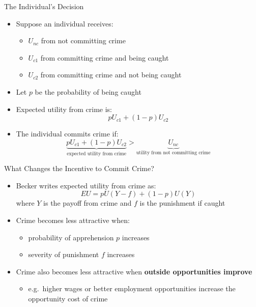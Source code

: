 \documentclass[11pt,notes=hide,aspectratio=169,mathserif]{beamer}
\begin{document}
\begin{frame}{The Individual's Decision}
\begin{itemize}
\item Suppose an individual receives:
\begin{itemize}
    \item $U_{nc}$ from not committing crime
    \item $U_{c1}$ from committing crime and being caught
    \item $U_{c2}$ from committing crime and not being caught
\end{itemize}
\pause \item Let $p$ be the probability of being caught
\pause \item Expected utility from crime is:
\pause
\[
pU_{c1}+(1-p)U_{c2}
\]
\pause \item The individual commits crime if:
\pause
\[
\underbrace{pU_{c1}+(1-p)U_{c2}}_{\text{expected utility from crime}}
>
\underbrace{U_{nc}}_{\text{utility from not committing crime}}
\]
\end{itemize}
\end{frame}

\begin{frame}{What Changes the Incentive to Commit Crime?}
\begin{itemize}
\item Becker writes expected utility from crime as:
\[
EU=pU(Y-f)+(1-p)U(Y)
\]
where $Y$ is the payoff from crime and $f$ is the punishment if caught
\pause \item Crime becomes less attractive when:
\begin{itemize}
    \pause \item probability of apprehension $p$ increases
    \pause \item severity of punishment $f$ increases
\end{itemize}
\pause \item Crime also becomes less attractive when \textbf{outside opportunities improve}
\begin{itemize}
    \item e.g.\ higher wages or better employment opportunities increase the opportunity cost of crime
\end{itemize}
\end{itemize}
\end{frame}
\end{document}
